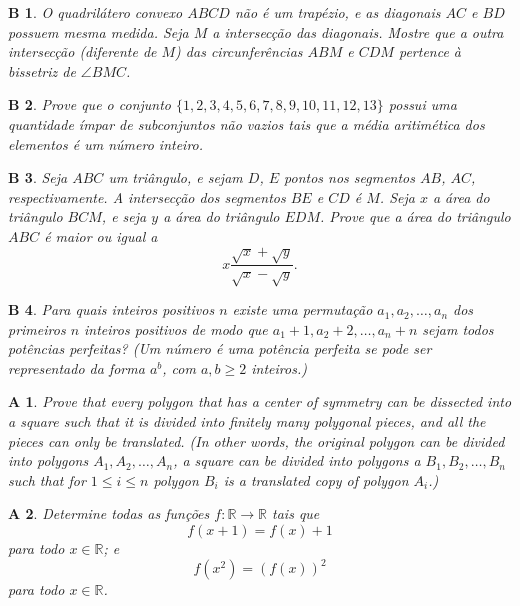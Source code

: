 \documentclass[12pt,a4paper]{scrartcl}
\theoremstyle{wonamestylealt}
\newtheorem{probb}{B}
\newtheorem{proba}{A}
\begin{document}
	\begin{probb}
		O quadrilátero convexo \(ABCD\) não é um trapézio, e as diagonais \(AC\) e \(BD\) possuem mesma medida. Seja \(M\) a intersecção das diagonais. Mostre que a outra intersecção (diferente de \(M\)) das circunferências \(ABM\) e \(CDM\) pertence à bissetriz de \(\angle BMC\).
	\end{probb}

	\begin{probb}
		Prove que o conjunto \(\{1,\allowbreak 2,\allowbreak 3,\allowbreak 4,\allowbreak 5,\allowbreak 6,\allowbreak 7,\allowbreak 8,\allowbreak 9,\allowbreak 10,\allowbreak 11,\allowbreak 12,\allowbreak 13\}\) possui uma quantidade ímpar de subconjuntos não vazios tais que a média aritimética dos elementos é um número inteiro.
	\end{probb}

	\begin{probb}
		Seja \(ABC\) um triângulo, e sejam \(D\), \(E\) pontos nos segmentos \(AB\), \(AC\), respectivamente. A intersecção dos segmentos \(BE\) e \(CD\) é \(M\). Seja \(x\) a área do triângulo \(BCM\), e seja \(y\) a área do triângulo \(EDM\). Prove que a área do triângulo \(ABC\) é maior ou igual a \[
			x \frac{\sqrt{x} + \sqrt{y}}{\sqrt{x} - \sqrt{y}}.
		\]
	\end{probb}

	\begin{probb}
		Para quais inteiros positivos \(n\) existe uma permutação \(a_1, a_2, \dots, a_n\) dos primeiros  \(n\) inteiros positivos de modo que \(a_1 + 1, a_2 + 2, \dots, a_n + n\) sejam todos potências perfeitas? (Um número é uma potência perfeita se pode ser representado da forma \(a^b\), com \(a, b \geq 2\) inteiros.)
	\end{probb}

	\setcounter{proba}{754}

	\begin{proba}
		Prove that every polygon that has a center of symmetry can be dissected into a square such that it is divided into finitely many polygonal pieces, and all the pieces can only be translated. (In other words, the original polygon can be divided into polygons $A_{1}, A_{2}, \ldots, A_{n}$, a square can be divided into polygons a $B_{1}, B_{2}, \ldots, B_{n}$ such that for $1 \leq i \leq n$ polygon $B_{i}$ is a translated copy of polygon $A_{i}$.)
	\end{proba}

	\newpage
	\begin{proba}
		Determine todas as funções $f: \mathbb{R} \rightarrow \mathbb{R}$ tais que
		\[f(x+1)=f(x)+1\] para todo \(x \in \mathbb{R}\); e
		\[f\left(x^{2}\right)=(f(x))^{2}\] para todo \(x \in \mathbb{R}\).
	\end{proba}
\end{document}
